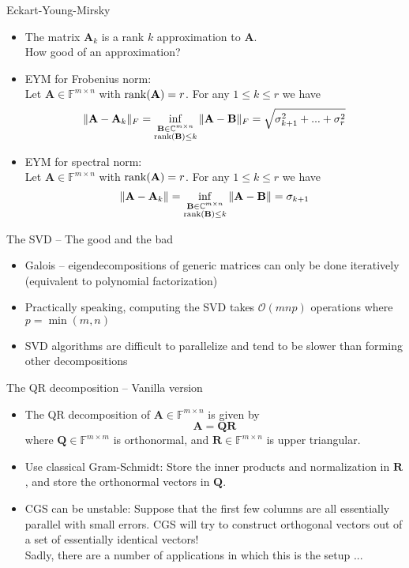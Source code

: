 \documentclass{beamer}
\newcommand{\bvec}[1]{\mathbf{#1}}
\newcommand{\vA}{\bvec{A}}
\newcommand{\vB}{\bvec{B}}
\newcommand{\vQ}{\bvec{Q}}
\newcommand{\vR}{\bvec{R}}
\newcommand{\bitem}{\item[$\bullet$]}
\begin{document}
\begin{frame}{Eckart-Young-Mirsky}

\begin{itemize}
    \bitem The matrix $\vA_k$ is a rank $k$ approximation to $\vA$.\\
    How good of an approximation?
    \bitem EYM for Frobenius norm:\\
    Let $\vA\in \mathbb{F}^{m \times n}$ with ${\rm rank}(\vA) = r$. For any $1 \leq k \leq r$ we have
    $$
    \Vert \vA - \vA_k \Vert_F 
    =
    \inf_{\substack{\vB \in \mathbb{C}^{m \times n}\\{\rm rank}(\vB) \leq k }}
    \Vert \vA - \vB \Vert_F
    =
    \sqrt{\sigma_{k+1}^2 + ... + \sigma_r^2}
    $$
    \bitem EYM for spectral norm:\\
    Let $\vA\in \mathbb{F}^{m \times n}$ with ${\rm rank}(\vA) = r$. For any $1 \leq k \leq r$ we have
    $$
    \Vert \vA - \vA_k \Vert
    =
    \inf_{\substack{\vB \in \mathbb{C}^{m \times n}\\{\rm rank}(\vB) \leq k }}
    \Vert \vA - \vB \Vert
    =
    \sigma_{k+1}
    $$
\end{itemize}
    
\end{frame}

\begin{frame}{The SVD -- The good and the bad}

\begin{itemize}
    \bitem Galois -- eigendecompositions of generic matrices can only be done iteratively\\
    (equivalent to polynomial factorization)
    \bitem Practically speaking, computing the SVD takes $\mathcal{O}(mnp)$ operations where $p = \min(m,n)$\\
    \bitem SVD algorithms are difficult to parallelize and tend to be slower than forming other decompositions
\end{itemize}
\end{frame}

\begin{frame}{The QR decomposition -- Vanilla version}
\begin{itemize}
    \bitem The QR decomposition of $\vA \in \mathbb{F}^{m \times n}$ is given by
    $$
    \vA = \vQ \vR
    $$
    where $\vQ\in\mathbb{F}^{m \times m}$ is orthonormal, and $\vR\in\mathbb{F}^{m \times n}$ is upper triangular. 
    \bitem Use classical Gram-Schmidt: Store the inner products and normalization in $\vR$, and store the orthonormal vectors in $\vQ$.
    \bitem CGS can be unstable: Suppose that the first few columns are all essentially parallel with small errors. CGS will try to construct orthogonal vectors out of a set of essentially identical vectors!\\
    Sadly, there are a number of applications in which this is the setup ...
\end{itemize}
\end{frame}
\end{document}
